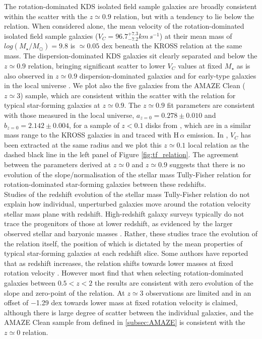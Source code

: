 \documentclass[fleqn,usenatbib]{mnras}
\begin{document}
The rotation-dominated KDS isolated field sample galaxies are broadly consistent within the scatter with the $z\simeq0.9$ relation, but with a tendency to lie below the relation.
When considered alone, the mean velocity of the rotation-dominated isolated field sample galaxies ($V_{C} = 96.7^{+7.3}_{-7.2}km\,s^{-1}$) at their mean mass of $log(M_{\star}/M_{\odot})=9.8$ is $\simeq0.05$ dex beneath the KROSS relation at the same mass.
The dispersion-dominated KDS galaxies sit clearly separated and below the $z\simeq0.9$ relation, bringing significant scatter to lower $V_{C}$ values at fixed $M_{\star}$ as is also observed in $z\simeq0.9$ dispersion-dominated galaxies and for early-type galaxies in the local universe \citep[e.g.][]{Romanowsky2012}. 
We plot also the five galaxies from the AMAZE Clean ($z\simeq3$) sample, which are consistent within the scatter with the relation for typical star-forming galaxies at $z\simeq0.9$.
The $z\simeq0.9$ fit parameters are consistent with those measured in the local universe, $a_{z=0} = 0.278 \pm 0.010$ and $b_{z=0} = 2.142 \pm 0.004$, for a sample of $z<0.1$ disks from \cite{Reyes2011}, which are in a similar mass range to the KROSS galaxies in \cite{Harrison2017} and traced with H$\,\alpha$ emission.
In \cite{Reyes2011}, $V_{C}$ has been extracted at the same radius and we plot this $z\simeq0.1$ local relation as the dashed black line in the left panel of Figure \ref{fig:tf_relation}.
The agreement between the parameters derived at $z\simeq0$ and $z\simeq0.9$ suggests that there is no evolution of the slope/normalisation of the stellar mass Tully-Fisher relation for rotation-dominated star-forming galaxies between these redshifts. \\


Studies of the redshift evolution of the stellar mass Tully-Fisher relation do not explain how individual, unperturbed galaxies move around the rotation velocity stellar mass plane with redshift. 
High-redshift galaxy surveys typically do not trace the progenitors of those at lower redshift, as evidenced by the larger observed stellar and baryonic masses \citep[e.g.][]{Cresci2009,Reyes2011,Wisnioski2015,Ubler2017}.
Rather, these studies trace the evolution of the relation itself, the position of which is dictated by the mean properties of typical star-forming galaxies at each redshift slice.
Some authors have reported that as redshift increases, the relation shifts towards lower masses at fixed rotation velocity \citep[e.g.][]{Puech2008,Cresci2009,Puech2010,Straatman2017,Ubler2017}.
However most find that when selecting rotation-dominated galaxies between $0.5 < z < 2$ \citep[e.g.][]{Flores2006,Miller2011,Kassin2012,Miller2012,Vergani2012,Miller2014,Contini2015a,DiTeodoro2016,Pelliccia2017,Molina2017,Harrison2017} the results are consistent with zero evolution of the slope and zero-point of the relation.
At $z\simeq3$ observations are limited and in \cite{Gnerucci2011} an offset of $-$1.29 dex towards lower mass at fixed rotation velocity is claimed, although there is large degree of scatter between the individual galaxies, and the AMAZE Clean sample from \cite{Gnerucci2011} defined in \cref{subsec:AMAZE} is consistent with the $z\simeq0$ relation. \\
\end{document}
